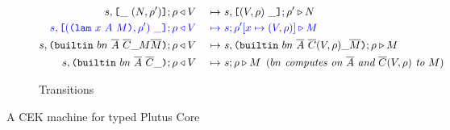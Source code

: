 \documentclass[../plutus-core-specification.tex]{subfiles}
\begin{document}
\begin{figure}[!ht]
\begin{subfigure}[c]{\linewidth}
\begin{alignat*}{2}
       s,\texttt{[} \_ ~ (N,\rho^{\prime}) \texttt{]}; \rho   &\triangleleft V &~\mapsto~& s, \texttt{[} (V,\rho) ~ \_ \texttt{]};\rho^{\prime} \triangleright N\\
       \textcolor{blue}{s,\texttt{[} (\texttt{(} \texttt{lam} ~ x ~ A ~ M \texttt{)}, \rho^{\prime}) ~ \_ \texttt{]}; \rho}
                                  &\color{blue}\triangleleft V &~\color{blue}\mapsto~& \textcolor{blue}{s;\rho^{\prime}[x\mapsto (V,\rho)] \triangleright M}\\
       s,  \texttt{(} \texttt{builtin} ~ bn ~ \overline{A} ~ \overline{C} \_ M \overline{M} \texttt{)}{}; \rho
                                  &\triangleleft V &~\mapsto~& s, \texttt{(} \texttt{builtin} ~ bn ~ \overline{A} ~ \overline{C}(V,\rho) \_ \overline{M} \texttt{)};\rho \triangleright M\\
       s,\texttt{(} \texttt{builtin} ~ bn ~ \overline{A} ~ \overline{C} \_  \texttt{)}; \rho &\triangleleft V 
                                                  &~\mapsto~& s;\rho \triangleright M \enspace (\textit{$bn$ computes on $\overline{A}$ and $\overline{C}(V,\rho)$ to $M$})\\
\end{alignat*}
\caption{Transitions}
\end{subfigure}
\caption{A CEK machine for typed Plutus Core}\label{fig:cek-machine}
\end{figure}
\end{document}
